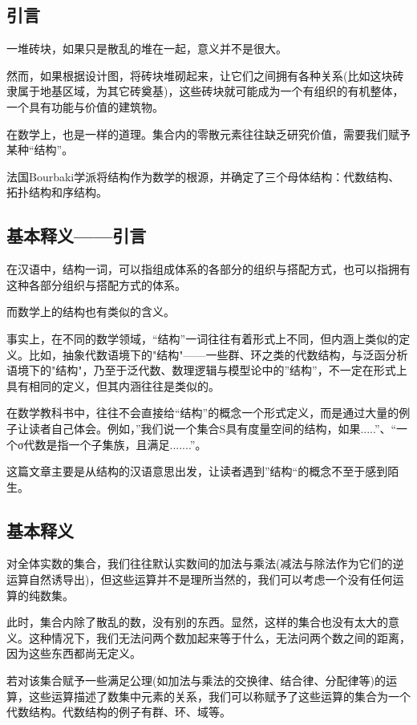 

\subsection{引言}
一堆砖块，如果只是散乱的堆在一起，意义并不是很大。

然而，如果根据设计图，将砖块堆砌起来，让它们之间拥有各种关系(比如这块砖隶属于地基区域，为其它砖奠基)，这些砖块就可能成为一个有组织的有机整体，一个具有功能与价值的建筑物。

在数学上，也是一样的道理。集合内的零散元素往往缺乏研究价值，需要我们赋予某种“结构”。

法国Bourbaki学派将结构作为数学的根源，并确定了三个母体结构：代数结构、拓扑结构和序结构。

\subsection{基本释义——引言}
在汉语中，结构一词，可以指组成体系的各部分的组织与搭配方式，也可以指拥有这种各部分组织与搭配方式的体系。

而数学上的结构也有类似的含义。

事实上，在不同的数学领域，“结构”一词往往有着形式上不同，但内涵上类似的定义。比如，抽象代数语境下的"结构"——一些群、环之类的代数结构，与泛函分析语境下的"结构"，乃至于泛代数、数理逻辑与模型论中的”结构”，不一定在形式上具有相同的定义，但其内涵往往是类似的。

在数学教科书中，往往不会直接给“结构”的概念一个形式定义，而是通过大量的例子让读者自己体会。例如，”我们说一个集合S具有度量空间的结构，如果.....”、“一个σ代数是指一个子集族，且满足.......”。

这篇文章主要是从结构的汉语意思出发，让读者遇到”结构“的概念不至于感到陌生。

\subsection{基本释义}

对全体实数的集合，我们往往默认实数间的加法与乘法(减法与除法作为它们的逆运算自然诱导出)，但这些运算并不是理所当然的，我们可以考虑一个没有任何运算的纯数集。

此时，集合内除了散乱的数，没有别的东西。显然，这样的集合也没有太大的意义。这种情况下，我们无法问两个数加起来等于什么，无法问两个数之间的距离，因为这些东西都尚无定义。 

若对该集合赋予一些满足公理(如加法与乘法的交换律、结合律、分配律等)的运算，这些运算描述了数集中元素的关系，我们可以称赋予了这些运算的集合为一个代数结构。代数结构的例子有群、环、域等。

